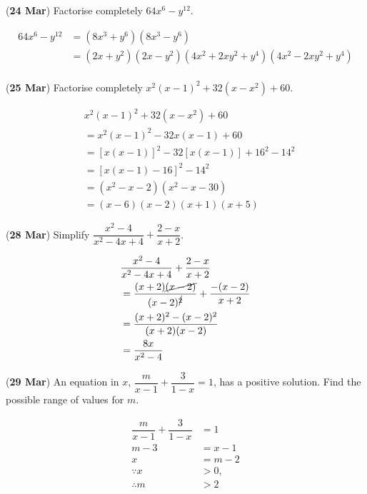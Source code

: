\documentclass[12pt, answers]{exam}
\begin{document}
\begin{questions}
	\question (\textbf{24 Mar}) Factorise completely
	\(64x^6 - y^{12}\).
	\begin{solution}
		\begin{align*}
			64x^6 - y^{12} & = (8x^3 + y^6)(8x^3 - y^6)                                     \\
			               & = (2x + y^2)(2x - y^2)(4x^2 + 2xy^2 + y^4)(4x^2 - 2xy^2 + y^4) \\
		\end{align*}
	\end{solution}

	\question (\textbf{25 Mar}) Factorise completely
	\(x^2(x-1)^2 + 32(x-x^2) + 60\).
	\begin{solution}
		\begin{align*}
			 & x^2(x-1)^2 + 32(x-x^2) + 60             \\
			 & = x^2(x-1)^2 - 32x(x-1) + 60            \\
			 & = [x(x-1)]^2 - 32[x(x-1)] + 16^2 - 14^2 \\
			 & = [x(x-1) - 16]^2 - 14^2                \\
			 & = (x^2-x-2)(x^2-x-30)                   \\
			 & = (x-6)(x-2)(x+1)(x+5)
		\end{align*}
	\end{solution}

	\question (\textbf{28 Mar}) Simplify
	\(\dfrac{x^2-4}{x^2-4x+4}+\dfrac{2-x}{x+2}\).
	\begin{solution}
		\begin{align*}
			 & \dfrac{x^2-4}{x^2-4x+4} + \dfrac{2-x}{x+2}                            \\
			 & = \dfrac{(x+2)\cancel{(x-2)}}{(x-2)^{\cancel{2}}} + \dfrac{-(x-2)}{x+2} \\
			 & = \dfrac{(x+2)^2 - (x-2)^2}{(x+2)(x-2)}                               \\
			 & = \dfrac{8x}{x^2 - 4}
		\end{align*}
	\end{solution}

	\question (\textbf{29 Mar}) An equation in \(x\),
	\(\dfrac{m}{x-1} + \dfrac{3}{1-x} = 1\), has a positive solution.
	Find the possible range of values for \(m\).
	\begin{solution}
		\begin{align*}
			\dfrac{m}{x-1} + \dfrac{3}{1-x} & = 1     \\
			m - 3                           & = x - 1 \\
			x                               & = m - 2 \\
			\because x                      & > 0,    \\
			\therefore m                    & >2      \\
		\end{align*}
	\end{solution}


\end{questions}
\end{document}
